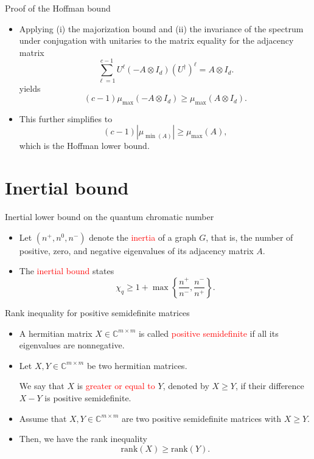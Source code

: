 \documentclass{beamer}
\newcommand{\C}{\mathbb{C}}
\renewcommand{\>}{\rangle}
\newcommand{\<}{\langle}
\begin{document}
%

\begin{frame}{Proof of the Hoffman bound}
\begin{itemize}
\item Applying (i) the majorization bound and (ii) the invariance of the spectrum under conjugation with unitaries to the 
matrix equality for the adjacency matrix
\[
\sum_{\ell=1}^{c-1} U^\ell (-A\otimes I_d) (U^\dagger)^\ell = A \otimes I_d.
\]
yields 
\[
(c-1) \mu_{\max}(-A \otimes I_d) \ge \mu_{\max}(A\otimes I_d).
\]
\item This further simplifies to
\[
(c-1) |\mu_{\min(A)}| \ge \mu_{\max}(A),
\]
which is the Hoffman lower bound.
\end{itemize}
\end{frame}

%

\section{Inertial bound}

\begin{frame}{Inertial lower bound on the quantum chromatic number}

\begin{itemize}
\item Let $(n^+, n^0, n^-)$ denote the \textcolor{red}{inertia} of a graph $G$, that is, the number of positive, zero, and negative eigenvalues of its adjacency matrix $A$.

\item The \textcolor{red}{inertial bound} states
\[
\chi_q \ge 1 + \max \left\{ \frac{n^+}{n^-}, \frac{n^-}{n^+} \right\}.
\]
\end{itemize}

\end{frame}

%

\begin{frame}{Rank inequality for positive semidefinite matrices}
\begin{itemize}
\item A hermitian matrix $X\in\C^{m\times m}$ is called \textcolor{red}{positive semidefinite} if all its eigenvalues are nonnegative.

\item Let $X,Y\in\C^{m\times m}$ be two hermitian matrices. 

\medskip
We say that $X$ is \textcolor{red}{greater or equal to} $Y$, denoted by $X\ge Y$, if their difference $X-Y$ is positive semidefinite.

\medskip
\item Assume that $X,Y\in\C^{m\times m}$ are two positive semidefinite matrices with $X\ge Y$.

\item Then, we have the rank inequality
\[
\mathrm{rank}(X) \ge \mathrm{rank}(Y).
\]
\end{itemize}
\end{frame}
\end{document}
